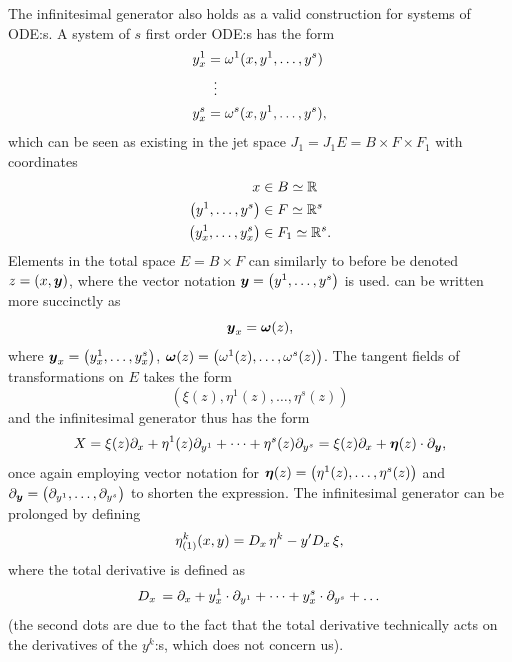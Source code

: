 The infinitesimal generator also holds as a valid construction for systems of ODE:s.
A system of \(s\) first order ODE:s has the form
\begin{align}
  \begin{split} \label{eq:first-order-system-ode}
    y^1_x &= \omega^1(x, y^1, \dots, y^s) \\
    &\equalsvdots \\
    y^s_x &= \omega^s(x, y^1, \dots, y^s),
  \end{split}
\end{align}
which can be seen as existing in the jet space \(J_1 = J_1 E = B \times F \times F_1\) with coordinates
\begin{align*}
  x &\in B \simeq \reals \\
  \left(y^1, \dots, y^s\right) &\in F \simeq \reals^s \\
  \left(y^1_x, \dots, y^s_x\right) &\in F_1 \simeq \reals^s.
\end{align*}
Elements in the total space \(E = B \times F\) can similarly to before be denoted \(z = \left(x, \vect{y}\right)\), where the vector notation \(\vect{y} = \left(y^1, \dots, y^s\right)\) is used.
 can be written more succinctly as
\begin{equation} \label{eq:first-order-system-ode-short}
  \boldsymbol{y}_x = \boldsymbol{\omega}(z),
\end{equation}
where \(\vect{y}_x = \left(y^1_x, \dots, y^s_x\right)\), \(\vect{\omega}(z) = \left(\omega^1(z), \dots, \omega^s(z)\right)\).
The tangent fields of transformations on \(E\) takes the form
\begin{equation*} %
  \left(\xi(z), \eta^1(z), \dots, \eta^s(z)\right)
\end{equation*}
and the infinitesimal generator thus has the form
\begin{equation*}
  X = \xi(z) \partial_x + \eta^1(z) \partial_{y^1} + \dots + \eta^s(z) \partial_{y^s} = \xi(z) \partial_x + \boldsymbol{\eta}(z) \cdot \partial_{\boldsymbol{y}},
\end{equation*}
once again employing vector notation for \(\vect{\eta}(z) = \left(\eta^1(z), \dots, \eta^s(z)\right)\) and \(\partial_{\vect{y}} = \left(\partial_{y^1}, \dots, \partial_{y^s}\right)\) to shorten the expression.
The infinitesimal generator can be prolonged by defining
\begin{equation*}
  {\eta^k_{(1)}}(x,y) =
  D_{x}\, \eta^k - y' D_{x}\, \xi,
\end{equation*}
where the total derivative is defined as
\begin{equation*}
  D_{x}\, = \partial_x + y^1_x \cdot \partial_{y^1} + \dots + y^s_x \cdot \partial_{y^s} + \dots
\end{equation*}
(the second dots are due to the fact that the total derivative technically acts on the derivatives of the \(y^k\):s, which does not concern us).

